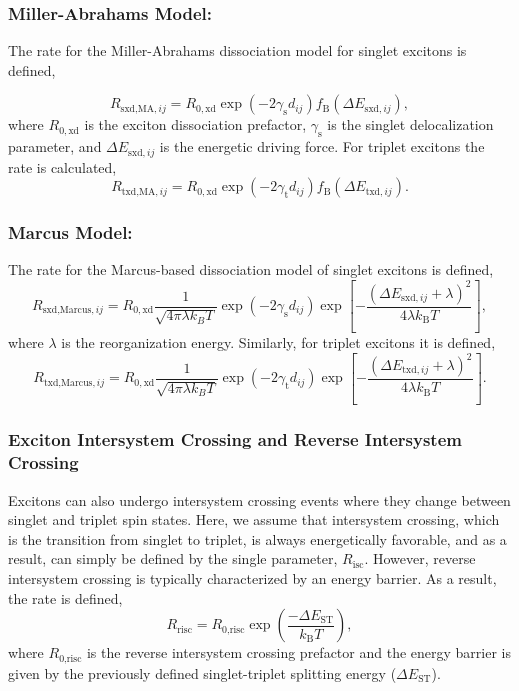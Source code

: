 \documentclass[%
 reprint,onecolumn,notitlepage,
superscriptaddress,longbibliography,
 amsmath,amssymb,
 aps,rmp,floatfix,
]{revtex4-1}
\begin{document}
\subsubsection*{\textbf{Miller-Abrahams Model:}}

The rate for the Miller-Abrahams dissociation model for singlet excitons is defined,

$$R_{\text{sxd,MA},ij} = R_{0,\text{xd}} \exp{\left(- 2 \gamma_{\text{s}} d_{ij} \right)} f_\text{B} \left( \Delta E_{\text{sxd},ij}\right),$$
where $R_{0,\text{xd}}$ is the exciton dissociation prefactor, $\gamma_{\text{s}}$ is the singlet delocalization parameter, and $\Delta E_{\text{sxd},ij}$ is the energetic driving force.
For triplet excitons the rate is calculated,
$$R_{\text{txd,MA},ij} = R_{0,\text{xd}} \exp{\left(- 2 \gamma_{\text{t}} d_{ij} \right)} f_\text{B} \left( \Delta E_{\text{txd},ij}\right).$$

\subsubsection*{\textbf{Marcus Model:}}

The rate for the Marcus-based dissociation model of singlet excitons is defined,
$$R_{\text{sxd,Marcus},ij} = R_{0,\text{xd}} \frac{1}{\sqrt{4\pi\lambda k_B T}}\exp{\left(- 2 \gamma_{\text{s}} d_{ij} \right)} \exp{\left[-\frac{(\Delta E_{\text{sxd},ij}+\lambda)^2}{4\lambda k_\text{B} T} \right]},$$
where $\lambda$ is the reorganization energy.
Similarly, for triplet excitons it is defined,
$$R_{\text{txd,Marcus},ij} = R_{0,\text{xd}} \frac{1}{\sqrt{4\pi\lambda k_B T}}\exp{\left(- 2 \gamma_{\text{t}} d_{ij} \right)} \exp{\left[-\frac{(\Delta E_{\text{txd},ij}+\lambda)^2}{4\lambda k_\text{B} T} \right]}.$$

\subsubsection{Exciton Intersystem Crossing and Reverse Intersystem Crossing}

Excitons can also undergo intersystem crossing events where they change between singlet and triplet spin states.
Here, we assume that intersystem crossing, which is the transition from singlet to triplet, is always energetically favorable, and as a result, can simply be defined by the single parameter, $R_\text{isc}$.
However, reverse intersystem crossing is typically characterized by an energy barrier.
As a result, the rate is defined,
$$R_\text{risc} = R_\text{0,risc} \exp\left(\frac{-\Delta E_\text{ST}}{k_\text{B}T}\right),$$
where $R_\text{0,risc}$ is the reverse intersystem crossing prefactor and the energy barrier is given by the previously defined singlet-triplet splitting energy ($\Delta E_\text{ST}$).
\end{document}
